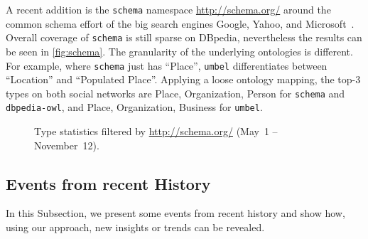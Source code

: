 \documentclass{iosart2c}
\begin{document}
A recent addition is the \texttt{schema} namespace \url{http://schema.org/} around the common schema effort of the big search engines Google, Yahoo, and Microsoft~\cite{schemaorg}.
Overall coverage of \texttt{schema} is still sparse on DBpedia, nevertheless the results can be seen in \autoref{fig:schema}.
The granularity of the underlying ontologies is different.
For example, where \texttt{schema} just has ``Place'', \texttt{umbel} differentiates between ``Location'' and ``Populated Place''.
Applying a loose ontology mapping, the top-3 types on both social networks are Place, Organization, Person for \texttt{schema} and \texttt{dbpedia-owl}, and Place, Organization, Business for \texttt{umbel}.

\begin{figure}
  \centering
    \qquad
\caption{Type statistics filtered by \url{http://schema.org/} (May~1 -- November~12).}
\label{fig:schema}
\end{figure}

\subsection{Events from recent History}
In this Subsection, we present some events from recent history and show how, using our approach, new insights or trends can be revealed.
\end{document}
